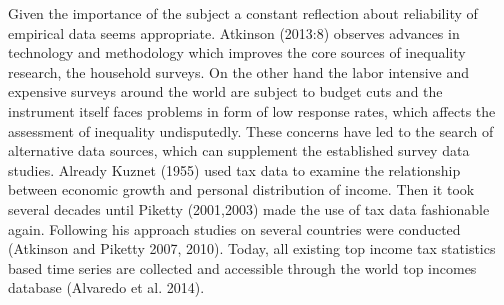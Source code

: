 \documentclass[twoside]{article}\usepackage[]{graphicx}\usepackage[]{color}
\begin{document}
\begin{multicols}{2}
Given the importance of the subject a constant reflection about reliability of empirical data seems appropriate. Atkinson (2013:8) observes advances in technology and methodology which improves the core sources of inequality research, the household surveys.  On the other hand the labor intensive and expensive surveys around the world are subject to budget cuts and the instrument itself faces problems in form of low response rates, which affects the assessment of inequality undisputedly. These concerns have led to the search of alternative data sources, which can supplement the established survey data studies. Already Kuznet (1955) used tax data to examine the relationship between economic growth and personal distribution of income. Then it took several decades until Piketty (2001,2003) made the use of tax data fashionable again. Following his approach studies on several countries were conducted (Atkinson and Piketty 2007, 2010). Today, all existing top income tax statistics based time series are collected and accessible through the world top incomes database (Alvaredo et al. 2014). \\


\end{multicols}
\end{document}
